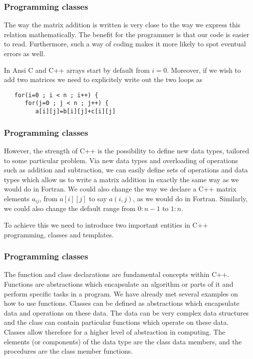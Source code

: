 \documentclass{beamer}
\begin{document}
\begin{frame}
\frametitle{Programming classes}

The way the matrix addition is written is very close to the way we express this relation mathematically. The benefit for the
programmer is that our code is easier to read. Furthermore, such a way of coding makes it  more likely  to spot eventual
errors as well.

In Ansi C and C++ arrays start by default from $i=0$.  Moreover, if we  wish to add two matrices we need to explicitely write out
the two loops as

\begin{verbatim}
   for(i=0 ; i < n ; i++) {
      for(j=0 ; j < n ; j++) {
         a[i][j]=b[i][j]+c[i][j]

\end{verbatim}
\end{frame}

\begin{frame}
\frametitle{Programming classes}

However,
the strength of C++ is the possibility
to define new data types, tailored to some particular problem.
Via new data types and overloading of operations such as addition and subtraction, we can easily define
sets of operations and data types which allow us to write a matrix addition in exactly the same
way as we would do in Fortran.  We could also change the way we declare a C++ matrix elements $a_{ij}$, from  $a[i][j]$
to say $a(i,j)$, as we would do in Fortran. Similarly, we could also change the default range from $0:n-1$ to $1:n$.

To achieve this we need to introduce two important entities in C++ programming, classes and templates.
\end{frame}

\begin{frame}
\frametitle{Programming classes}

The function and class declarations are fundamental concepts within C++.  Functions are abstractions
which encapsulate an algorithm or parts of it and perform specific tasks in a program.
We have already met several examples on how to use  functions.
Classes can be defined as abstractions which encapsulate
data and operations on these data.
The data can be very complex data structures  and the class can contain particular functions
which operate on these data. Classes allow therefore for a higher level of abstraction in computing.
The elements (or components) of the data
type are the class data members, and the procedures are the class
member functions.
\end{frame}
\end{document}
